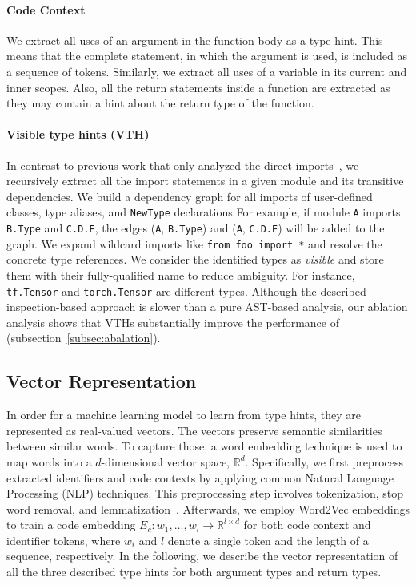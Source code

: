 \paragraph{Code Context}
We extract all uses of an argument in the function body as a type hint.
This means that the complete statement, in which the argument is used, is included as a sequence of tokens. Similarly, we extract all uses of a variable in its current and inner scopes.
Also, all the return statements inside a function are extracted as they may contain a hint about the return type of the function.

\paragraph{Visible type hints (VTH)}
In contrast to previous work that only analyzed the direct imports~\cite{pradel2019typewriter}, we recursively extract all the import statements in a given module and its transitive dependencies.
We build a dependency graph for all imports of user-defined classes, type aliases, and \texttt{NewType} declarations
For example, if module \texttt{A} imports \texttt{B.Type} and \texttt{C.D.E}, the edges (\texttt{A}, \texttt{B.Type}) and (\texttt{A}, \texttt{C.D.E}) will be added to the graph.
We expand wildcard imports like \texttt{from foo import *} and resolve the concrete type references.
We consider the identified types as \emph{visible} and store them with their fully-qualified name to reduce ambiguity. For instance, \texttt{tf.Tensor} and \texttt{torch.Tensor} are different types.
Although the described inspection-based approach is slower than a pure AST-based analysis, our ablation analysis shows that VTHs substantially improve the performance of \name (subsection~\ref{subsec:abalation}).

\subsection{Vector Representation}
In order for a machine learning model to learn from type hints, they are represented as real-valued vectors. The vectors preserve semantic similarities between similar words. To capture those, a word embedding technique is used to map words into a $d$-dimensional vector space, $\mathbb{R}^{d}$. Specifically, we first preprocess extracted identifiers and code contexts by applying common Natural Language Processing (NLP) techniques. This preprocessing step involves tokenization, stop word removal, and lemmatization~\cite{JurafskyNLP}. Afterwards, we employ Word2Vec \cite{mikolov2013distributed} embeddings to train a code embedding $E_{c}: w_{1},\dots,w_{l} \to \mathbb{R}^{l \times d}$ for both code context and identifier tokens, where $w_{i}$ and $l$ denote a single token and the length of a sequence, respectively. In the following, we describe the vector representation of all the three described type hints for both argument types and return types.

